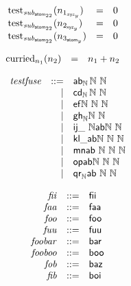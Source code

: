 $$
\begin{array}{@{}lcl@{}l@{}}
{\mathrm{test}}_{{\mathit{sub}}_{{\mathsf{atom}}_{22}}}(n_{1_{{\mathit{xyz}}_y}}) &=& 0 \\
{\mathrm{test}}_{{\mathit{sub}}_{{\mathsf{atom}}_{22}}}(n_{2_{{\mathsf{xyz}}_y}}) &=& 0 \\
{\mathrm{test}}_{{\mathit{sub}}_{{\mathsf{atom}}_{22}}}(n_{3_{{\mathsf{atom}}_y}}) &=& 0 \\
\end{array}
$$

$$
\begin{array}{@{}lcl@{}l@{}}
{{\mathrm{curried}}}_{n_1}(n_2) &=& n_1 + n_2 \\
\end{array}
$$

$$
\begin{array}{@{}lrrl@{}l@{}}
& {\mathit{testfuse}} &::=& {\mathsf{ab}}_{\mathbb{N}}\,\mathbb{N}~\mathbb{N} \\ &&|&
{\mathsf{cd}}_{\mathbb{N}}\,\mathbb{N}~\mathbb{N} \\ &&|&
{\mathsf{ef}}{\mathbb{N}}~\mathbb{N}~\mathbb{N} \\ &&|&
{{\mathsf{gh}}_{\mathbb{N}}}{\mathbb{N}}~\mathbb{N} \\ &&|&
{{\mathsf{ij}}{\mathsf{\_}}~\mathbb{N}}{\mathsf{ab}}{\mathbb{N}}~\mathbb{N} \\ &&|&
{\mathsf{kl\_ab}}{\mathbb{N}}~\mathbb{N}~\mathbb{N} \\ &&|&
{\mathsf{mn}}{\mathsf{ab}}~\mathbb{N}~\mathbb{N}~\mathbb{N} \\ &&|&
{\mathsf{op}}{\mathsf{ab}}{\mathbb{N}}~\mathbb{N}~\mathbb{N} \\ &&|&
{{\mathsf{qr}}_{\mathbb{N}}}{\mathsf{ab}}~\mathbb{N}~\mathbb{N} \\
\end{array}
$$

\vspace{1ex}

\vspace{1ex}

$$
\begin{array}{@{}lrrl@{}l@{}}
& {\mathit{fii}} &::=& \mathsf{fii} \\
& {\mathit{faa}} &::=& \mathsf{faa} \\
& {\mathit{foo}} &::=& \mathsf{foo} \\
& {\mathit{fuu}} &::=& \mathsf{fuu} \\
& {\mathit{foobar}} &::=& \mathsf{bar} \\
& {\mathit{fooboo}} &::=& \mathsf{boo} \\
& {\mathit{fob}} &::=& \mathsf{baz} \\
& {\mathit{fib}} &::=& \mathsf{boi} \\
\end{array}
$$

